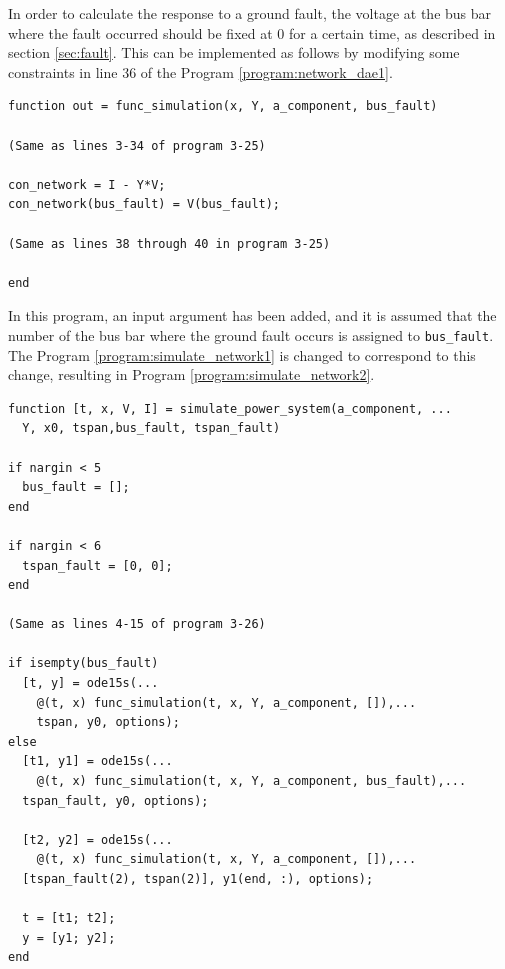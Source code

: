 \documentclass[graybox, envcountchap]{svmult}
\begin{document}
\begin{example}
In order to calculate the response to a ground fault, the voltage at the bus bar where the fault occurred should be fixed at $0$ for a certain time, as described in section \ref{sec:fault}.
This can be implemented as follows by modifying some constraints in line 36 of the Program \nobreak\ref{program:network_dae1}.

\smallskip
\begin{PROGRAMA}[count,title={func\_simulation.m}]\label{program:network_dae_fault}
\begin{verbatim}
function out = func_simulation(x, Y, a_component, bus_fault)

(Same as lines 3-34 of program 3-25)

con_network = I - Y*V;
con_network(bus_fault) = V(bus_fault);

(Same as lines 38 through 40 in program 3-25)

end
\end{verbatim}
\end{PROGRAMA}

In this program, an input argument has been added, and it is assumed that the number of the bus bar where the ground fault occurs is assigned to \verb|bus_fault|.
The Program \nobreak\ref{program:simulate_network1} is changed to correspond to this change, resulting in Program \ref{program:simulate_network2}.

\smallskip
\begin{PROGRAMA}[count,title={simulate\_power\_system.m}]\label{program:simulate_network2}
  \begin{verbatim}
function [t, x, V, I] = simulate_power_system(a_component, ...
  Y, x0, tspan,bus_fault, tspan_fault)

if nargin < 5
  bus_fault = [];
end

if nargin < 6
  tspan_fault = [0, 0];
end

(Same as lines 4-15 of program 3-26)

if isempty(bus_fault)
  [t, y] = ode15s(...
    @(t, x) func_simulation(t, x, Y, a_component, []),...
    tspan, y0, options);
else
  [t1, y1] = ode15s(...
    @(t, x) func_simulation(t, x, Y, a_component, bus_fault),...
  tspan_fault, y0, options);
  
  [t2, y2] = ode15s(...
    @(t, x) func_simulation(t, x, Y, a_component, []),...
  [tspan_fault(2), tspan(2)], y1(end, :), options);

  t = [t1; t2];
  y = [y1; y2];
end


\end{verbatim}
\end{PROGRAMA}
\end{example}
\end{document}
